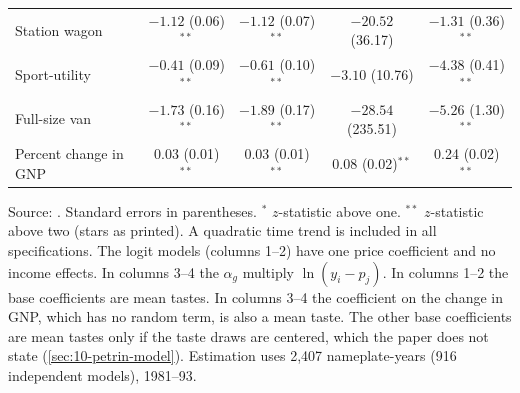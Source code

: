\begin{table}[htbp]
\begin{tabular}{@{}lcccc@{}}
Station wagon             & $-1.12$ (0.06)$^{**}$  & $-1.12$ (0.07)$^{**}$  & $-20.52$ (36.17)       & $-1.31$ (0.36)$^{**}$ \\
Sport-utility             & $-0.41$ (0.09)$^{**}$  & $-0.61$ (0.10)$^{**}$  & $-3.10$ (10.76)        & $-4.38$ (0.41)$^{**}$ \\
Full-size van             & $-1.73$ (0.16)$^{**}$  & $-1.89$ (0.17)$^{**}$  & $-28.54$ (235.51)      & $-5.26$ (1.30)$^{**}$ \\
Percent change in GNP     & 0.03 (0.01)$^{**}$     & 0.03 (0.01)$^{**}$     & 0.08 (0.02)$^{**}$     & 0.24 (0.02)$^{**}$ \\
\bottomrule
\end{tabular}

\smallskip
\begin{minipage}{0.97\textwidth}
\footnotesize Source: \citet[Table~4]{Petrin2002}. Standard errors in parentheses. $^{*}$ $z$-statistic above one.
$^{**}$ $z$-statistic above two (stars as printed). A quadratic time trend is included in all specifications. The
logit models (columns 1--2) have one price coefficient and no income effects. In columns 3--4 the $\alpha_g$ multiply
$\ln(y_i - p_j)$. In columns 1--2 the base coefficients are mean tastes. In columns 3--4 the coefficient on the change in GNP,
which has no random term, is also a mean taste. The other base coefficients are mean tastes only if the taste draws
are centered, which the paper does not state (\cref{sec:10-petrin-model}). Estimation uses 2,407
nameplate-years (916 independent models), 1981--93.
\end{minipage}
\end{table}

